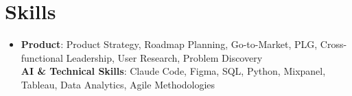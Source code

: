 \documentclass[letterpaper,11pt]{article}
\newcommand{\resumeSubHeadingListStart}{\begin{itemize}[leftmargin=0in, label={}]}
\newcommand{\resumeSubHeadingListEnd}{\end{itemize}}
\begin{document}
\section{Skills}
\resumeSubHeadingListStart
  \item[]
  \small{
    \textbf{Product}: Product Strategy, Roadmap Planning, Go-to-Market, PLG, Cross-functional Leadership, User Research, Problem Discovery \\
    \textbf{AI \& Technical Skills}: Claude Code, Figma, SQL, Python, Mixpanel, Tableau, Data Analytics, Agile Methodologies
  }
\resumeSubHeadingListEnd
\end{document}
